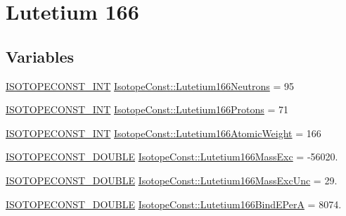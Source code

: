 \hypertarget{group___isotope_const-_lutetium-_lu166}{}\section{Lutetium 166}
\label{group___isotope_const-_lutetium-_lu166}
\subsection*{Variables}
\begin{DoxyCompactItemize}
\item 
\mbox{\hyperlink{group___isotope_const-_macros_ga5f18360b3e99483a35c32d789e62621c}{I\+S\+O\+T\+O\+P\+E\+C\+O\+N\+S\+T\+\_\+\+I\+NT}} \mbox{\hyperlink{group___isotope_const-_lutetium-_lu166_ga58bca3b61f28da4ec5899ff4fd4d68ef}{Isotope\+Const\+::\+Lutetium166\+Neutrons}} = 95
\item 
\mbox{\hyperlink{group___isotope_const-_macros_ga5f18360b3e99483a35c32d789e62621c}{I\+S\+O\+T\+O\+P\+E\+C\+O\+N\+S\+T\+\_\+\+I\+NT}} \mbox{\hyperlink{group___isotope_const-_lutetium-_lu166_gaf948ab09309e65ba32b2ace2bdb31975}{Isotope\+Const\+::\+Lutetium166\+Protons}} = 71
\item 
\mbox{\hyperlink{group___isotope_const-_macros_ga5f18360b3e99483a35c32d789e62621c}{I\+S\+O\+T\+O\+P\+E\+C\+O\+N\+S\+T\+\_\+\+I\+NT}} \mbox{\hyperlink{group___isotope_const-_lutetium-_lu166_gae1021ca109f5d56c37c11297018a1b40}{Isotope\+Const\+::\+Lutetium166\+Atomic\+Weight}} = 166
\item 
\mbox{\hyperlink{group___isotope_const-_macros_ga8f45a7272ce02c0b4c65c44636ed719a}{I\+S\+O\+T\+O\+P\+E\+C\+O\+N\+S\+T\+\_\+\+D\+O\+U\+B\+LE}} \mbox{\hyperlink{group___isotope_const-_lutetium-_lu166_ga8b04c4e55316cb45ba21967b0e59f968}{Isotope\+Const\+::\+Lutetium166\+Mass\+Exc}} = -\/56020.
\item 
\mbox{\hyperlink{group___isotope_const-_macros_ga8f45a7272ce02c0b4c65c44636ed719a}{I\+S\+O\+T\+O\+P\+E\+C\+O\+N\+S\+T\+\_\+\+D\+O\+U\+B\+LE}} \mbox{\hyperlink{group___isotope_const-_lutetium-_lu166_ga16f140a11af557b028bfa5fb572636a1}{Isotope\+Const\+::\+Lutetium166\+Mass\+Exc\+Unc}} = 29.
\item 
\mbox{\hyperlink{group___isotope_const-_macros_ga8f45a7272ce02c0b4c65c44636ed719a}{I\+S\+O\+T\+O\+P\+E\+C\+O\+N\+S\+T\+\_\+\+D\+O\+U\+B\+LE}} \mbox{\hyperlink{group___isotope_const-_lutetium-_lu166_gac1c9ff26f59c282328a3a23387a6655a}{Isotope\+Const\+::\+Lutetium166\+Bind\+E\+PerA}} = 8074.
\item 

\end{DoxyCompactItemize}
